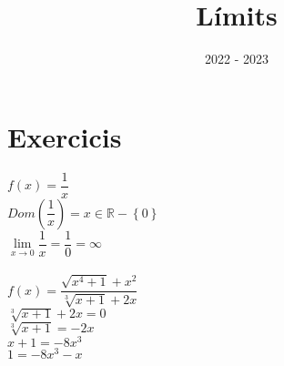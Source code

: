 \documentclass[12pt,a4paper]{article}
\title{Límits}
\author{}
\date{2022 - 2023}
\newcommand{\limit}[1]{\lim\limits_{x\to#1}}
\begin{document}
\maketitle
\section{Exercicis}
$f(x)=\dfrac{1}{x}$\\
$Dom\left(\dfrac{1}{x}\right)=x\in\mathbb{R}-\left\{0\right\}$\\
$\limit{0}\dfrac{1}{x}=\dfrac{1}{0}=\infty$\\\\
$f(x)=\dfrac{\sqrt{x^4+1}+x^2}{\sqrt[3]{x+1}+2x}$\\
$\sqrt[3]{x+1}+2x=0$\\
$\sqrt[3]{x+1}=-2x$\\
$x+1=-8x^3$\\
$1=-8x^3-x$\\
\end{document}
